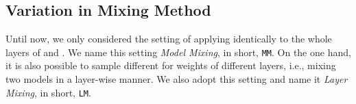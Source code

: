 \documentclass[sigconf]{acmart}
\begin{document}
\subsection{Variation in Mixing Method} Until now, we only considered the setting of applying  identically to the whole layers of  and . We name this setting \textit{Model Mixing}, in short, \texttt{MM}. On the one hand, it is also possible to sample different  for weights of different layers, i.e., mixing two models in a layer-wise manner. We also adopt this setting and name it \textit{Layer Mixing}, in short, \texttt{LM}. 


\begin{table}[!htb]
\centering
\caption{Experimental results on the \textit{pathological non-IID setting} (MNIST and CIFAR10 datasets) compared with other FL and PFL methods. The top-1 accuracy is reported with a standard deviation.}
\label{table1}
\end{table}
\end{document}
